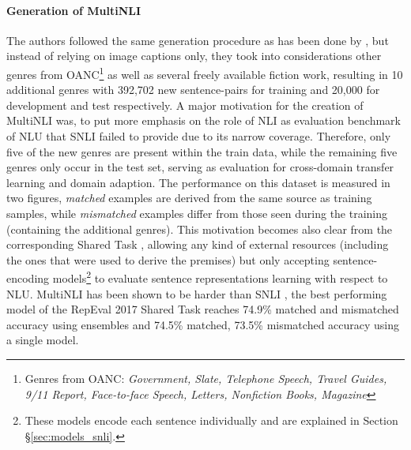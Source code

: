 \paragraph*{Generation of \ac{MultiNLI}}
The authors followed the same generation procedure as has been done by \cite{bowman2015large}, but instead of relying on image captions only, they took into considerations other genres from \ac{OANC}\footnote{Genres from \ac{OANC}: \textit{Government, Slate, Telephone Speech, Travel Guides, 9/11 Report, Face-to-face Speech, Letters, Nonfiction Books, Magazine}} \citep{ide2001american,ide2004american,ide2006integrating} as well as several freely available fiction work, resulting in 10 additional genres with 392,702 new sentence-pairs for training and 20,000 for development and test respectively. A major motivation for the creation of \ac{MultiNLI} was, to put more emphasis on the role of \ac{NLI} as evaluation benchmark of \ac{NLU} that \ac{SNLI} failed to provide due to its narrow coverage. Therefore, only five of the new genres are present within the train data, while the remaining five genres only occur in the test set, serving as evaluation for cross-domain transfer learning and domain adaption. The performance on this dataset is measured in two figures, \textit{matched} examples are derived from the same source as training samples, while \textit{mismatched} examples differ from those seen during the training (containing the additional genres). This motivation becomes also clear from the corresponding Shared Task \citep{nangia2017repeval}, allowing any kind of external resources (including the ones that were used to derive the premises) but only accepting sentence-encoding models\footnote{These models encode each sentence individually and are explained in Section §\ref{sec:models_snli}.} to evaluate sentence representations learning with respect to \ac{NLU}. \ac{MultiNLI} has been shown to be harder than \ac{SNLI} \citep{williams2017broad}, the best performing model of the RepEval 2017 Shared Task reaches 74.9\% matched and mismatched accuracy \citep{chen2017recurrent} using ensembles and 74.5\% matched, 73.5\% mismatched accuracy using a single model\citep{nie2017shortcut}. 
